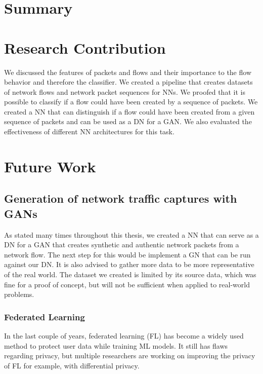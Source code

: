 \documentclass[
	ngerman,
	ruledheaders=section,%
	class=report,%
	thesis={type=bachelor},%
	accentcolor=9c,%
	custommargins=true,%
	marginpar=false,%
	parskip=half-,%
	fontsize=11pt,%
]{tudapub}
\begin{document}

\section{Summary}

\section{Research Contribution}

We discussed the features of packets and flows and their importance to the flow behavior and therefore the classifier.
We created a pipeline that creates datasets of network flows and network packet sequences for NNs.
We proofed that it is possible to classify if a flow could have been created by a sequence of packets.
We created a NN that can distinguish if a flow could have been created from a given sequence of packets and can be used as a DN for a GAN.
We also evaluated the effectiveness of different NN architectures for this task.

\section{Future Work}

\subsection{Generation of network traffic captures with GANs}

As stated many times throughout this thesis, we created a NN that can serve as a DN for a GAN that creates synthetic and authentic network packets from a network flow.
The next step for this would be implement a GN that can be run against our DN.
It is also advised to gather more data to be more representative of the real world.
The dataset we created is limited by its source data, which was fine for a proof of concept, but will not be sufficient when applied to real-world problems.

\subsubsection{Federated Learning}

In the last couple of years, federated learning (FL) has become a widely used method to protect user data while training ML models.
It still has flaws regarding privacy, but multiple researchers are working on improving the privacy of FL for example, with differential privacy.
\end{document}
